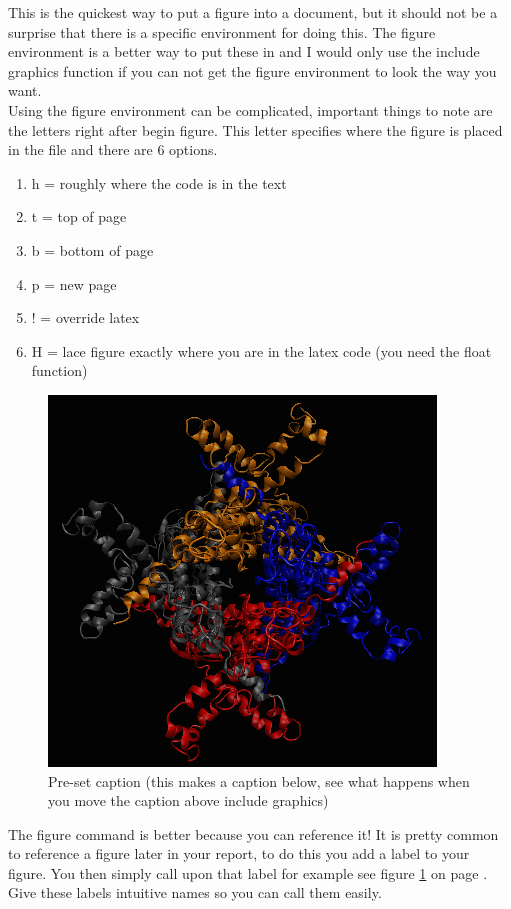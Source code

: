 \documentclass{article}
\begin{document}
This is the quickest way to put a figure into a document, but it should not be a surprise that there is a specific environment for doing this.
The figure environment is a better way to put these in and I would only use the include graphics function if you can not get the figure environment to look the way you want. \\
Using the figure environment can be complicated, important things to note are the letters right after begin figure.
This letter specifies where the figure is placed in the file and there are 6 options.
\begin{enumerate}
    \item h = roughly where the code is in the text
    \item t = top of page
    \item b = bottom of page
    \item p = new page
    \item ! = override latex 
    \item H = lace figure exactly where you are in the latex code (you need the float function) \end{enumerate}


\begin{figure}[! h]
    \centering
    \includegraphics{fig1}
    \caption{Pre-set caption (this makes a caption below, see what happens when you move the caption above include graphics)}
    \label{fig:protein}
\end{figure}

The figure command is better because you can reference it!
It is pretty common to reference a figure later in your report, to do this you add a label to your figure.
You then simply call upon that label for example see figure \ref{fig:protein} on page \pageref{fig:protein}.
Give these labels intuitive names so you can call them easily.
\end{document}
